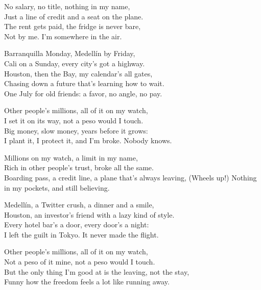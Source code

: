 \begin{lyrics}
No salary, no title, nothing in my name,\\
Just a line of credit and a seat on the plane.\\
The rent gets paid, the fridge is never bare,\\
Not by me. I'm somewhere in the air.

Barranquilla Monday, Medellín by Friday,\\
Cali on a Sunday, every city's got a highway.\\
Houston, then the Bay, my calendar's all gates,\\
Chasing down a future that's learning how to wait.\\
One July for old friends: a favor, no angle, no pay.

Other people's millions, all of it on my watch,\\
I set it on its way, not a peso would I touch.\\
Big money, slow money, years before it grows:\\
I plant it, I protect it, and I'm broke. Nobody knows.

Millions on my watch, a limit in my name,\\
Rich in other people's trust, broke all the same.\\
Boarding pass, a credit line, a plane that's always leaving,
(Wheels up!) Nothing in my pockets, and still believing.

Medellín, a Twitter crush, a dinner and a smile,\\
Houston, an investor's friend with a lazy kind of style.\\
Every hotel bar's a door, every door's a night:\\
I left the guilt in Tokyo. It never made the flight.

Other people's millions, all of it on my watch,\\
Not a peso of it mine, not a peso would I touch.\\
But the only thing I'm good at is the leaving, not the stay,\\
Funny how the freedom feels a lot like running away.


\end{lyrics}
